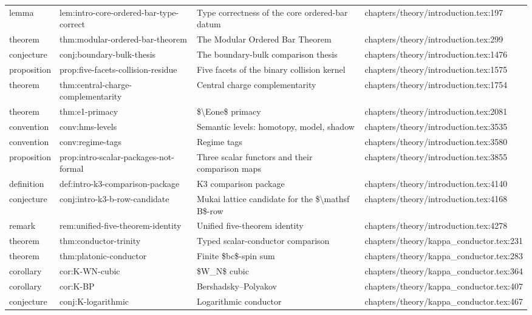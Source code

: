 \documentclass[11pt]{article}
\begin{document}
\begin{longtable}{L{0.10\textwidth}L{0.26\textwidth}L{0.42\textwidth}L{0.22\textwidth}}
lemma & lem:intro-core-ordered-bar-type-correct & Type correctness of the core ordered-bar datum & chapters/theory/introduction.tex:197\\
theorem & thm:modular-ordered-bar-theorem & The Modular Ordered Bar Theorem & chapters/theory/introduction.tex:299\\
conjecture & conj:boundary-bulk-thesis & The boundary-bulk comparison thesis & chapters/theory/introduction.tex:1476\\
proposition & prop:five-facets-collision-residue & Five facets of the binary collision kernel & chapters/theory/introduction.tex:1575\\
theorem & thm:central-charge-complementarity & Central charge complementarity & chapters/theory/introduction.tex:1754\\
theorem & thm:e1-primacy & \$\textbackslash{}Eone\$ primacy & chapters/theory/introduction.tex:2081\\
convention & conv:hms-levels & Semantic levels: homotopy, model, shadow & chapters/theory/introduction.tex:3535\\
convention & conv:regime-tags & Regime tags & chapters/theory/introduction.tex:3580\\
proposition & prop:intro-scalar-packages-not-formal & Three scalar functors and their comparison maps & chapters/theory/introduction.tex:3855\\
definition & def:intro-k3-comparison-package & K3 comparison package & chapters/theory/introduction.tex:4140\\
conjecture & conj:intro-k3-b-row-candidate & Mukai lattice candidate for the \$\textbackslash{}mathsf B\$-row & chapters/theory/introduction.tex:4168\\
remark & rem:unified-five-theorem-identity & Unified five-theorem identity & chapters/theory/introduction.tex:4278\\
theorem & thm:conductor-trinity & Typed scalar-conductor comparison & chapters/theory/kappa\_conductor.tex:231\\
theorem & thm:platonic-conductor & Finite \$bc\$-spin sum & chapters/theory/kappa\_conductor.tex:283\\
corollary & cor:K-WN-cubic & \$W\_N\$ cubic & chapters/theory/kappa\_conductor.tex:364\\
corollary & cor:K-BP & Bershadsky--Polyakov & chapters/theory/kappa\_conductor.tex:407\\
conjecture & conj:K-logarithmic & Logarithmic conductor & chapters/theory/kappa\_conductor.tex:467\\

\end{longtable}
\end{document}
